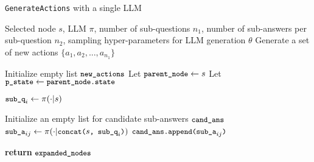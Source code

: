 \begin{algorithm}[tb]
\caption{\texttt{\small GenerateActions} {\small with a single LLM}}
\label{alg:expand}
\begin{algorithmic}
\REQUIRE Selected node $s$, LLM $\pi$, number of sub-questions $n_1$, number of sub-answers per sub-question $n_2$, sampling hyper-parameters for LLM generation $\theta$
\ENSURE Generate a set of new actions $\{a_1, a_2, ..., a_{n_1}\}$

\STATE Initialize empty list $\texttt{\small new\_actions}$
\STATE Let \hspace{1pt} $\texttt{\small parent\_node} \leftarrow s$
\STATE Let \hspace{1pt} $\texttt{\small p\_state} \leftarrow \texttt{\small parent\_node.state}$

\STATE {}
\STATE $\texttt{\small sub\_q}_i \leftarrow \pi(\cdot|s)$

\STATE Initialize an empty list for candidate sub-answers $\texttt{\small cand\_ans}$
\STATE {}
\STATE $\texttt{\small sub\_a}_{ij} \leftarrow \pi(\cdot|\texttt{\small concat(} s \texttt{\small, sub\_q}_i \texttt{\small )})$
\STATE {}
\STATE $\texttt{\small cand\_ans.append(sub\_a}_{ij} \texttt{\small )}$
\ENDFOR

\ENDFOR

\STATE \textbf{return} $\texttt{\small expanded\_nodes}$
\end{algorithmic}
\end{algorithm}